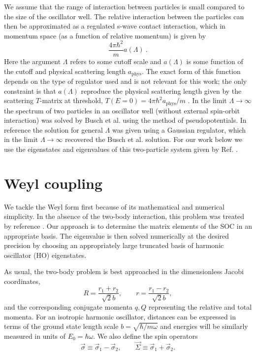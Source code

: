 \documentclass[%
 onecolumn,
 notitlepage,
 amsmath,amssymb,
 aps,
]{revtex4-1}
\begin{document}
We assume that the range of interaction between particles is small compared to the size of the oscillator well.  The relative interaction between the particles can then be approximated as a regulated s-wave contact interaction, which in momentum space (as a function of relative momentum) is given by
\begin{equation}
\frac{4\pi \hbar^2}{m}a(\Lambda)\ .
\end{equation}
Here the argument $\Lambda$ refers to some cutoff scale and $a(\Lambda)$ is some function of the cutoff and physical scattering length $a_{\text{phys}}$.  The exact form of this function depends on the type of regulator used and is not relevant for this work; the only constraint is that $a(\Lambda)$ reproduce the physical scattering length given by the scattering $T$-matrix at threshold, $T(E=0)=4\pi\hbar^2 a_{\text{phys}}/m$ \cite{taylor2000}. In the limit $\Lambda\rightarrow \infty$ the spectrum of two particles in an oscillator well (without external spin-orbit interaction) was solved by Busch et al. \cite{Busch} using the method of pseudopotentials.  In reference  \cite{Luu:2006xv} the solution for general $\Lambda$ was given using a Gaussian regulator, which in the limit $\Lambda\rightarrow\infty$ recovered the Busch et al. solution.  For our work below we use the eigenstates and eigenvalues of this two-particle system given by Ref. \cite{Busch}.

\section{\label{sec:Weyl}Weyl coupling}
We tackle the Weyl form first because of its mathematical and numerical simplicity. In the absence of the two-body interaction, this problem was treated by reference \cite{0953-4075-46-13-134003}. Our approach is to determine the matrix elements of the SOC in an appropriate basis. The eigenvalue is then solved numerically at the desired precision by choosing an appropriately large truncated basis of harmonic oscillator (HO) eigenstates.

As usual, the two-body problem is best approached in the dimensionless Jacobi coordinates,
\begin{equation}
R=\frac{r_1+r_2}{\sqrt{2}b}, \qquad r=\frac{r_1-r_2}{\sqrt{2}b},
\end{equation}
and the corresponding conjugate momenta $q,Q$ representing the relative and total momenta. For an isotropic harmonic oscillator, distances can be expressed in terms of the ground state length scale $b=\sqrt{\hbar/m\omega}$ and energies will be similarly measured in units of $E_0=\hbar\omega$. We also define the spin operators
\begin{equation}
\vec{\sigma}\equiv\vec{\sigma}_1-\vec{\sigma}_2, \qquad \vec{\Sigma}\equiv\vec{\sigma}_1+\vec{\sigma}_2.
\end{equation}
\end{document}
